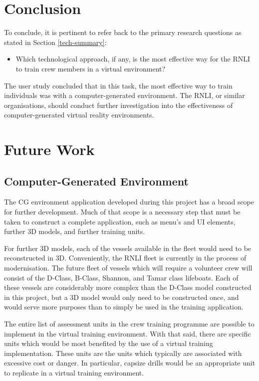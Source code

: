 \documentclass[ %
                    author={Elis Jones},
                supervisor={Dr. Kirsten Cater},
                    degree={BSc},
                     title={The Effect of Presentation Medium on Spatial Cognition},
                  subtitle={in the Virtual Environment},
                      year={2018} ]{dissertation}
\begin{document}
\section{Conclusion}
To conclude, it is pertinent to refer back to the primary research questions as stated in Section \ref{tech-summary}:

\begin{itemize}
    \item Which technological approach, if any, is the most effective way for the RNLI to train crew members in a virtual environment?
\end{itemize}

The user study concluded that in this task, the most effective way to train individuals was with a computer-generated environment. The RNLI, or similar organisations, should conduct further investigation into the effectiveness of computer-generated virtual reality environments. 

\section{Future Work}\label{further}
\subsection{Computer-Generated Environment}
The CG environment application developed during this project has a broad scope for further development. Much of that scope is a necessary step that must be taken to construct a complete application, such as menu's and UI elements, further 3D models, and further training units. 

For further 3D models, each of the vessels available in the fleet would need to be reconstructed in 3D. Conveniently, the RNLI fleet is currently in the process of modernisation. The future fleet of vessels which will require a volunteer crew will consist of the D-Class, B-Class, Shannon, and Tamar class lifeboats. Each of these vessels are considerably more complex than the D-Class model constructed in this project, but a 3D model would only need to be constructed once, and would serve more purposes than to simply be used in the training application. 

The entire list of assessment units in the crew training programme are possible to implement in the virtual training environment. With that said, there are specific units which would be most benefited by the use of a virtual training implementation. These units are the units which typically are associated with excessive cost or danger. In particular, capsize drills would be an appropriate unit to replicate in a virtual training environment. 
\end{document}
